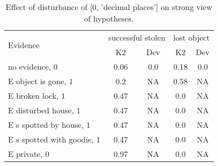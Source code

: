 \begin{table}\begin{tabular}{l|cc|cc}\toprule\multirow{2}{*}{Evidence} & \multicolumn{2}{c}{successful stolen}& \multicolumn{2}{c}{lost object}\\& {K2} & {Dev}& {K2} & {Dev}\\\midrule
no evidence, 0 & \cellcolor{Bittersweet}0.06&\cellcolor{Bittersweet}0.0&\cellcolor{Bittersweet}0.18&\cellcolor{Bittersweet}0.0\\E object is gone, 1 & \cellcolor{Bittersweet}0.2&\cellcolor{Bittersweet}NA&\cellcolor{Bittersweet}0.58&\cellcolor{Bittersweet}NA\\E broken lock, 1 & \cellcolor{Bittersweet}0.47&\cellcolor{Bittersweet}NA&\cellcolor{Bittersweet}0.0&\cellcolor{Bittersweet}NA\\E disturbed house, 1 & \cellcolor{Bittersweet}0.47&\cellcolor{Bittersweet}NA&\cellcolor{Bittersweet}0.0&\cellcolor{Bittersweet}NA\\E s spotted by house, 1 & \cellcolor{Bittersweet}0.47&\cellcolor{Bittersweet}NA&\cellcolor{Bittersweet}0.0&\cellcolor{Bittersweet}NA\\E s spotted with goodie, 1 & \cellcolor{Bittersweet}0.47&\cellcolor{Bittersweet}NA&\cellcolor{Bittersweet}0.0&\cellcolor{Bittersweet}NA\\E private, 0 & \cellcolor{Bittersweet}0.97&\cellcolor{Bittersweet}NA&\cellcolor{Bittersweet}0.0&\cellcolor{Bittersweet}NA\\\bottomrule\end{tabular}\caption{Effect of disturbance of [0, 'decimal places'] on strong view of hypotheses.}\end{table}